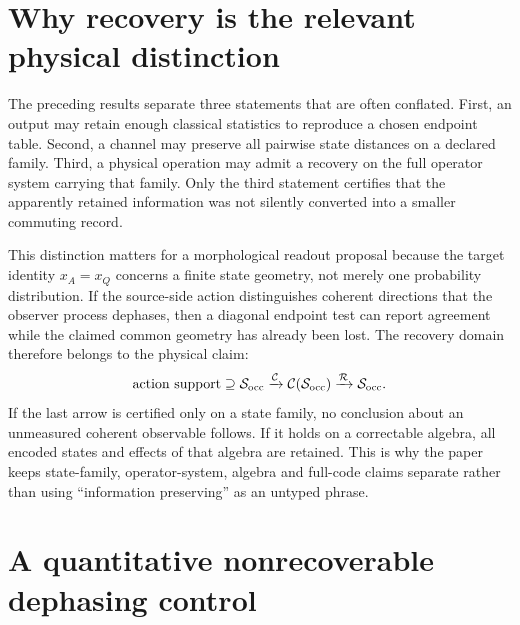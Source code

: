 \documentclass[11pt]{article}
\begin{document}
\section{Why recovery is the relevant physical distinction}

The preceding results separate three statements that are often conflated.
First, an output may retain enough classical statistics to reproduce a chosen
endpoint table.  Second, a channel may preserve all pairwise state distances
on a declared family.  Third, a physical operation may admit a recovery on the
full operator system carrying that family.  Only the third statement certifies
that the apparently retained information was not silently converted into a
smaller commuting record.

This distinction matters for a morphological readout proposal because the
target identity \(x_A=x_Q\) concerns a finite state geometry, not merely one
probability distribution.  If the source-side action distinguishes coherent
directions that the observer process dephases, then a diagonal endpoint test
can report agreement while the claimed common geometry has already been lost.
The recovery domain therefore belongs to the physical claim:
\begin{equation}
 \text{action support}
 \supseteq \mathcal S_{\rm occ}
 \xrightarrow{\mathcal C}
 \mathcal C(\mathcal S_{\rm occ})
 \xrightarrow{\mathcal R}
 \mathcal S_{\rm occ}.
 \label{eq:recovery-claim-chain}
\end{equation}
If the last arrow is certified only on a state family, no conclusion about an
unmeasured coherent observable follows.  If it holds on a correctable algebra,
all encoded states and effects of that algebra are retained.  This is why the
paper keeps state-family, operator-system, algebra and full-code claims
separate rather than using ``information preserving'' as an untyped phrase.

\section{A quantitative nonrecoverable dephasing control}
\end{document}
